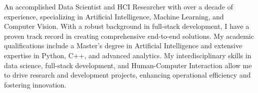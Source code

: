 %
%
%
\par{
An accomplished Data Scientist and HCI Researcher with over a decade of experience, specializing in Artificial Intelligence, Machine Learning, and Computer Vision. With a robust background in full-stack development, I have a proven track record in creating comprehensive end-to-end solutions. My academic qualifications include a Master's degree in Artificial Intelligence and extensive expertise in Python, C++, and advanced analytics. My interdisciplinary skills in data science, full-stack development, and Human-Computer Interaction allow me to drive research and development projects, enhancing operational efficiency and fostering innovation.
}
\vspace{6.6mm}
